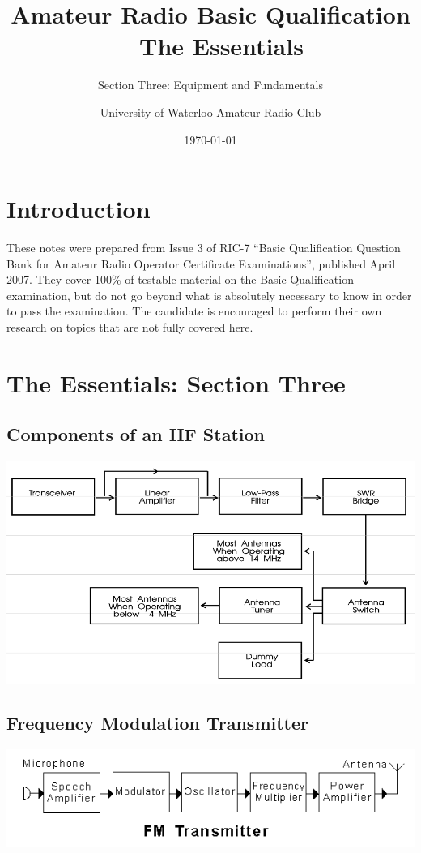 \documentclass[letterpaper,12pt]{scrartcl}
\title{Amateur Radio Basic Qualification -- The Essentials}
\subtitle{Section Three: Equipment and Fundamentals}
\author{University of Waterloo Amateur Radio Club}
\date{\today}
\begin{document}
\maketitle
\tableofcontents

\section{Introduction}

These notes were prepared from Issue 3 of RIC-7 ``Basic Qualification Question Bank for Amateur Radio Operator Certificate Examinations'', published April 2007.
They cover 100\% of testable material on the Basic Qualification examination, but do not go beyond what is absolutely necessary to know in order to pass the examination.
The candidate is encouraged to perform their own research on topics that are not fully covered here.

\section{The Essentials: Section Three}

\subsection{Components of an HF Station}

\includegraphics[width=150mm]{hf-station.png}

\subsection{Frequency Modulation Transmitter}

\includegraphics[width=150mm]{fm-transmitter.png}
\end{document}
